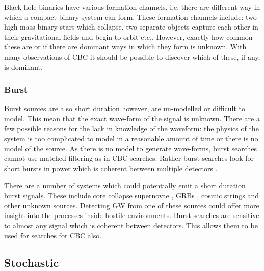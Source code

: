 Black hole binaries have various formation channels, i.e. there are different way in which a compact binary system can form. 
These formation channels include: two high mass binary stars which collapse, two separate objects capture each other in their gravitational fields and begin to orbit etc..
However, exactly how common these are or if there are dominant ways in which they form is unknown. 
With many observations of \ac{CBC} it should be possible to discover which of these, if any, is dominant.


\subsubsection{\label{sources:transient:burst}Burst}

Burst sources are also short duration however, are un-modelled or difficult to model.
This mean that the exact wave-form of the signal is unknown.
There are a few possible reasons for the lack in knowledge of the waveform: the physics of the system is too complicated to model in a reasonable amount of time or there is no model of the source.
As there is no model to generate wave-forms, burst searches cannot use matched filtering as in \ac{CBC} searches.
Rather burst searches look for short bursts in power which is coherent between multiple detectors \cite{Cornish2015Bayeswave:Glitches,Klimenko2008ABursts}.

There are a number of systems which could potentially emit a short duration burst signals.
These include core collapse supernovae \cite{Ott2008TheSupernovae}, \acp{GRB} \cite{Aasi2014SearchNetwork}, cosmic strings \cite{Damour2005GravitationalWindows} and other unknown sources.
Detecting \ac{GW} from one of these sources could offer more insight into the processes inside hostile environments.
Burst searches are sensitive to almost any signal which is coherent between detectors. 
This allows them to be used for searches for \ac{CBC} also.



\subsection{Stochastic}

